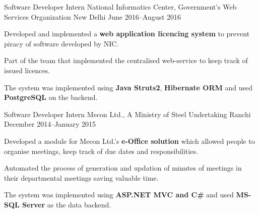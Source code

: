 
\begin{cventries}

\cventry%
  {Software Developer Intern} %
  {National Informatics Center, Government's Web Services Organization} %
  {New Delhi} %
  {June 2016--August 2016} %
  {%
    \begin{cvitems} %
      \item{Developed and implemented a \textbf{web application licencing system}
            to prevent piracy of software developed by NIC.}
      \item{Part of the team that implemented the centralised web-service to
            keep track of issued licences.}
      \item{The system was implemented using \textbf{Java Struts2},
            \textbf{Hibernate ORM} and used \textbf{PostgreSQL} on the backend.}
    \end{cvitems}
  }

\cventry%
  {Software Developer Intern} %
  {Mecon Ltd., A Ministry of Steel Undertaking} %
  {Ranchi} %
  {December 2014--January 2015} %
  {%
    \begin{cvitems} %
      \item{Developed a module for Mecon Ltd.'s \textbf{e-Office solution} which
            allowed people to organise meetings, keep track of due dates
            and responsibilities.}
      \item{Automated the process of generation and updation of minutes of
            meetings in their departmental meetings saving valuable time.}
      \item{The system was implemented using \textbf{ASP.NET MVC and C\#} and
            used \textbf{MS-SQL Server} as the data backend.}
    \end{cvitems}
  }

\end{cventries}
